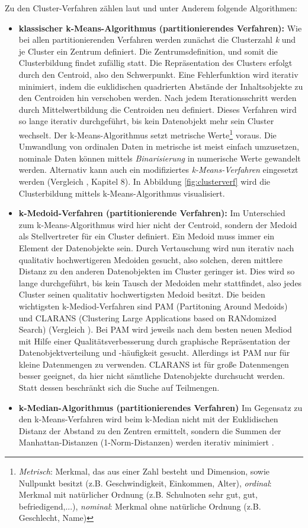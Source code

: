 Zu den Cluster-Verfahren zählen laut  und  unter Anderem folgende Algorithmen:

\begin{itemize}
		\item \textbf{klassischer k-Means-Algorithmus (partitionierendes Verfahren):} Wie bei allen partitionierenden Verfahren werden zunächst die Clusterzahl \textit{k} und je Cluster ein Zentrum definiert. Die Zentrumsdefinition, und somit die Clusterbildung findet zufällig statt. Die Repräsentation des Clusters erfolgt durch den Centroid, also den Schwerpunkt. Eine Fehlerfunktion wird iterativ minimiert, indem die euklidischen quadrierten Abstände der Inhaltsobjekte zu den Centroiden hin verschoben werden. Nach jedem Iterationsschritt werden durch Mittelwertbildung die Centroiden neu definiert. Dieses Verfahren wird so lange iterativ durchgeführt, bis kein Datenobjekt mehr sein Cluster wechselt. Der k-Means-Algorithmus setzt metrische Werte\footnote{\textit{Metrisch}: Merkmal, das aus einer Zahl besteht und Dimension, sowie Nullpunkt besitzt (z.B. Geschwindigkeit, Einkommen, Alter), \textit{ordinal}: Merkmal mit natürlicher Ordnung (z.B. Schulnoten sehr gut, gut, befriedigend,...), \textit{nominal}: Merkmal ohne natürliche Ordnung (z.B. Geschlecht, Name)} voraus. Die Umwandlung von ordinalen Daten in metrische ist meist einfach umzusetzen, nominale Daten können mittels \textit{Binarisierung} in numerische Werte gewandelt werden. Alternativ kann auch ein modifiziertes \textit{k-Means-Verfahren} eingesetzt werden (Vergleich , Kapitel 8). In Abbildung \ref{fig:clusterverf} wird die Clusterbildung mittels k-Means-Algorithmus visualisiert.
		\item \textbf{k-Medoid-Verfahren (partitionierende Verfahren):} Im Unterschied zum k-Means-Algorithmus wird hier nicht der Centroid, sondern der Medoid als Stellvertreter für ein Cluster definiert. Ein Medoid muss immer ein Element der Datenobjekte sein. Durch Vertauschung wird nun iterativ nach qualitativ hochwertigeren Medoiden gesucht, also solchen, deren mittlere Distanz zu den anderen Datenobjekten im Cluster geringer ist. Dies wird so lange durchgeführt, bis kein Tausch der Medoiden mehr stattfindet, also jedes Cluster seinen qualitativ hochwertigsten Medoid besitzt. Die beiden wichtigsten k-Mediod-Verfahren sind PAM (Partitoning Around Medoids) und CLARANS (Clustering Large Applications based on RANdomized Search) (Vergleich ). Bei PAM wird jeweils nach dem besten neuen Mediod mit Hilfe einer Qualitätsverbesserung durch graphische Repräsentation der Datenobjektverteilung und -häufigkeit gesucht. Allerdings ist PAM nur für kleine Datenmengen zu verwenden. CLARANS ist für große Datenmengen besser geeignet, da hier nicht sämtliche Datenobjekte durchsucht werden. Statt dessen beschränkt sich die Suche auf Teilmengen.   
		\item \textbf{k-Median-Algorithmus (partitionierendes Verfahren)} Im Gegensatz zu den k-Means-Verfahren wird beim k-Median nicht mit der Euklidischen Distanz der Abstand zu den Zentren ermittelt, sondern die Summen der Manhattan-Distanzen (1-Norm-Distanzen) werden iterativ minimiert .


\end{itemize}

